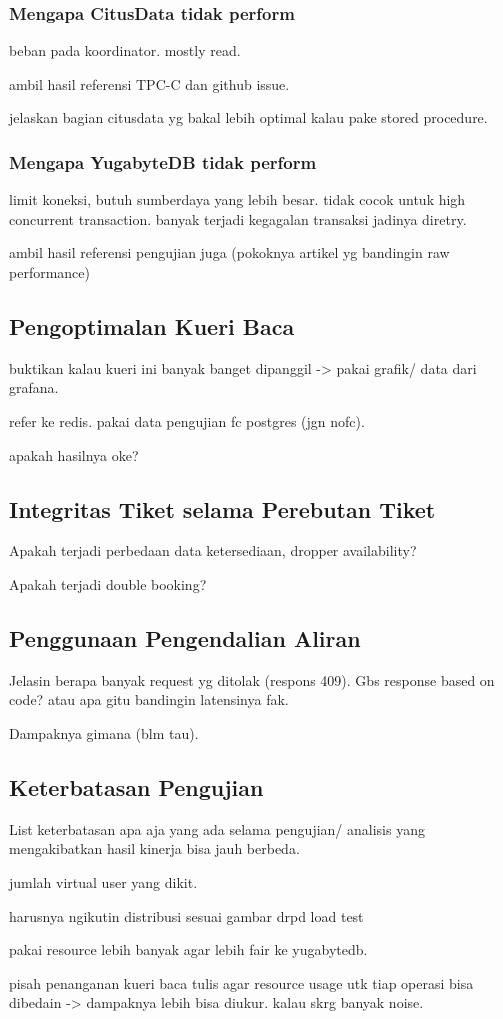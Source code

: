\subsubsection{Mengapa CitusData tidak perform}

beban pada koordinator. mostly read.

ambil hasil referensi TPC-C dan github issue.

jelaskan bagian citusdata yg bakal lebih optimal kalau pake stored procedure.

\subsubsection{Mengapa YugabyteDB tidak perform}

limit koneksi, butuh sumberdaya yang lebih besar. tidak cocok untuk high concurrent transaction. banyak terjadi kegagalan transaksi jadinya diretry.

ambil hasil referensi pengujian juga (pokoknya artikel yg bandingin raw performance)

\subsection{Pengoptimalan Kueri Baca}

buktikan kalau kueri ini banyak banget dipanggil -> pakai grafik/ data dari grafana.

refer ke redis. pakai data pengujian fc postgres (jgn nofc).

apakah hasilnya oke?

\subsection{Integritas Tiket selama Perebutan Tiket}

Apakah terjadi perbedaan data ketersediaan, dropper availability?

Apakah terjadi double booking?

\subsection{Penggunaan Pengendalian Aliran}

Jelasin berapa banyak request yg ditolak (respons 409). Gbs response based on code? atau apa gitu bandingin latensinya fak.

Dampaknya gimana (blm tau).

\subsection{Keterbatasan Pengujian}

List keterbatasan apa aja yang ada selama pengujian/ analisis yang mengakibatkan hasil kinerja bisa jauh berbeda.

jumlah virtual user yang dikit.

harusnya ngikutin distribusi sesuai gambar drpd load test

pakai resource lebih banyak agar lebih fair ke yugabytedb.

pisah penanganan kueri baca tulis agar resource usage utk tiap operasi bisa dibedain -> dampaknya lebih bisa diukur. kalau skrg banyak noise.
